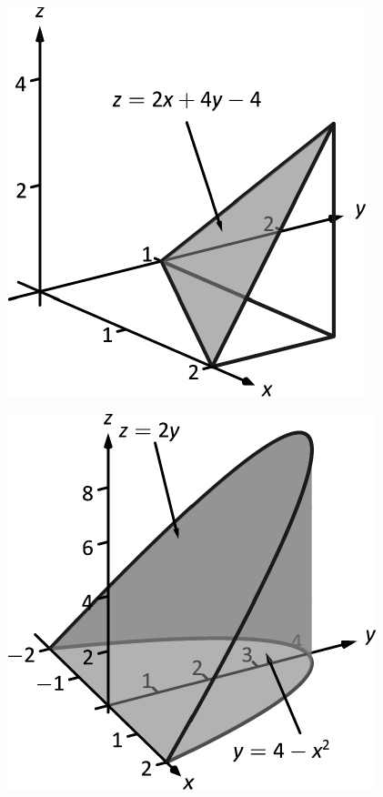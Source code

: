 \documentclass[10pt]{article}
\begin{document}
\includegraphics{fig13_06_ex_11_3DBW.pdf}
\texttt{}

\includegraphics{fig13_06_ex_12_3DBW.pdf}
\texttt{}
\end{document}

